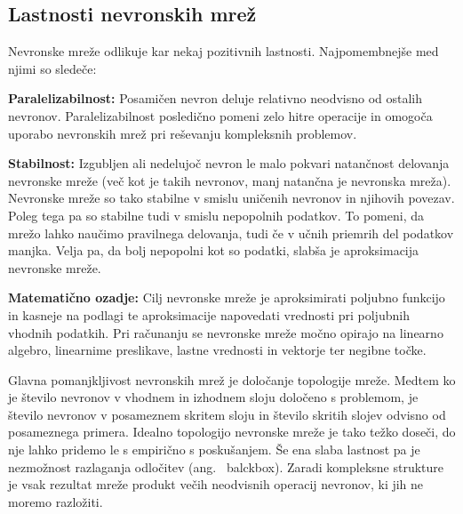 \documentclass[mat1]{fmfdelo}
\begin{document}
\subsection{Lastnosti nevronskih mrež}
Nevronske mreže odlikuje kar nekaj pozitivnih lastnosti. Najpomembnejše med njimi so sledeče:

\textbf{Paralelizabilnost: }Posamičen nevron deluje relativno neodvisno od ostalih nevronov. Paralelizabilnost posledično pomeni zelo hitre operacije in omogoča uporabo nevronskih mrež pri reševanju kompleksnih problemov.

\textbf{Stabilnost: }Izgubljen ali nedelujoč nevron le malo pokvari natančnost delovanja nevronske mreže (več kot je takih nevronov, manj natančna je nevronska mreža). Nevronske mreže so tako stabilne v smislu uničenih nevronov in njihovih povezav. Poleg tega pa so stabilne tudi v smislu nepopolnih podatkov. To pomeni, da mrežo lahko naučimo pravilnega delovanja, tudi če v učnih priemrih del podatkov manjka. Velja pa, da bolj nepopolni kot so podatki, slabša je aproksimacija nevronske mreže.

\textbf{Matematično ozadje: }Cilj nevronske mreže je aproksimirati poljubno funkcijo in kasneje na podlagi te aproksimacije napovedati vrednosti pri poljubnih vhodnih podatkih. Pri računanju se nevronske mreže močno opirajo na linearno algebro, linearnime preslikave, lastne vrednosti in vektorje ter negibne točke.

Glavna pomanjkljivost nevronskih mrež je določanje topologije mreže. Medtem ko je število nevronov v vhodnem in izhodnem sloju določeno s problemom, je število nevronov v posameznem skritem sloju in število skritih slojev odvisno od posameznega primera. Idealno topologijo nevronske mreže je tako težko doseči, do nje lahko pridemo le s empirično s poskušanjem. Še ena slaba lastnost pa je nezmožnost razlaganja odločitev (ang.~ balckbox). Zaradi kompleksne strukture je vsak rezultat mreže produkt večih neodvisnih operacij nevronov, ki jih ne moremo razložiti.

%
%
\end{document}
